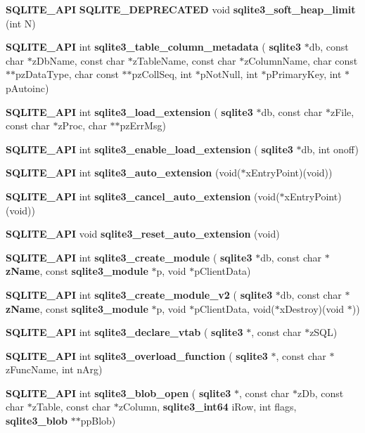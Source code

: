 \begin{DoxyCompactItemize}
\item 
\textbf{ S\+Q\+L\+I\+T\+E\+\_\+\+A\+PI} \textbf{ S\+Q\+L\+I\+T\+E\+\_\+\+D\+E\+P\+R\+E\+C\+A\+T\+ED} void \textbf{ sqlite3\+\_\+soft\+\_\+heap\+\_\+limit} (int N)
\item 
\textbf{ S\+Q\+L\+I\+T\+E\+\_\+\+A\+PI} int \textbf{ sqlite3\+\_\+table\+\_\+column\+\_\+metadata} (\textbf{ sqlite3} $\ast$db, const char $\ast$z\+Db\+Name, const char $\ast$z\+Table\+Name, const char $\ast$z\+Column\+Name, char const $\ast$$\ast$pz\+Data\+Type, char const $\ast$$\ast$pz\+Coll\+Seq, int $\ast$p\+Not\+Null, int $\ast$p\+Primary\+Key, int $\ast$p\+Autoinc)
\item 
\textbf{ S\+Q\+L\+I\+T\+E\+\_\+\+A\+PI} int \textbf{ sqlite3\+\_\+load\+\_\+extension} (\textbf{ sqlite3} $\ast$db, const char $\ast$z\+File, const char $\ast$z\+Proc, char $\ast$$\ast$pz\+Err\+Msg)
\item 
\textbf{ S\+Q\+L\+I\+T\+E\+\_\+\+A\+PI} int \textbf{ sqlite3\+\_\+enable\+\_\+load\+\_\+extension} (\textbf{ sqlite3} $\ast$db, int onoff)
\item 
\textbf{ S\+Q\+L\+I\+T\+E\+\_\+\+A\+PI} int \textbf{ sqlite3\+\_\+auto\+\_\+extension} (void($\ast$x\+Entry\+Point)(void))
\item 
\textbf{ S\+Q\+L\+I\+T\+E\+\_\+\+A\+PI} int \textbf{ sqlite3\+\_\+cancel\+\_\+auto\+\_\+extension} (void($\ast$x\+Entry\+Point)(void))
\item 
\textbf{ S\+Q\+L\+I\+T\+E\+\_\+\+A\+PI} void \textbf{ sqlite3\+\_\+reset\+\_\+auto\+\_\+extension} (void)
\item 
\textbf{ S\+Q\+L\+I\+T\+E\+\_\+\+A\+PI} int \textbf{ sqlite3\+\_\+create\+\_\+module} (\textbf{ sqlite3} $\ast$db, const char $\ast$\textbf{ z\+Name}, const \textbf{ sqlite3\+\_\+module} $\ast$p, void $\ast$p\+Client\+Data)
\item 
\textbf{ S\+Q\+L\+I\+T\+E\+\_\+\+A\+PI} int \textbf{ sqlite3\+\_\+create\+\_\+module\+\_\+v2} (\textbf{ sqlite3} $\ast$db, const char $\ast$\textbf{ z\+Name}, const \textbf{ sqlite3\+\_\+module} $\ast$p, void $\ast$p\+Client\+Data, void($\ast$x\+Destroy)(void $\ast$))
\item 
\textbf{ S\+Q\+L\+I\+T\+E\+\_\+\+A\+PI} int \textbf{ sqlite3\+\_\+declare\+\_\+vtab} (\textbf{ sqlite3} $\ast$, const char $\ast$z\+S\+QL)
\item 
\textbf{ S\+Q\+L\+I\+T\+E\+\_\+\+A\+PI} int \textbf{ sqlite3\+\_\+overload\+\_\+function} (\textbf{ sqlite3} $\ast$, const char $\ast$z\+Func\+Name, int n\+Arg)
\item 
\textbf{ S\+Q\+L\+I\+T\+E\+\_\+\+A\+PI} int \textbf{ sqlite3\+\_\+blob\+\_\+open} (\textbf{ sqlite3} $\ast$, const char $\ast$z\+Db, const char $\ast$z\+Table, const char $\ast$z\+Column, \textbf{ sqlite3\+\_\+int64} i\+Row, int flags, \textbf{ sqlite3\+\_\+blob} $\ast$$\ast$pp\+Blob)

\end{DoxyCompactItemize}
